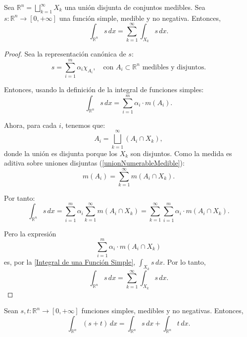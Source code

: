 \begin{lema}
    Sea $\mathbb{R}^n = \bigsqcup_{k = 1}^{\infty} X_k$ una unión disjunta de conjuntos medibles. Sea $s: \mathbb{R}^n \to [0, +\infty]$ una función simple, medible y no negativa. Entonces,
    \[
        \int_{\mathbb{R}^n} s \, dx = \sum_{k = 1}^{\infty} \int_{X_k} s \, dx.
    \]
    \label{intSimpleDisjunta}
\end{lema}

\begin{proof}
    Sea la representación canónica de $s$:
    \[
        s = \sum_{i=1}^m \alpha_i \chi_{A_i}, \quad \text{con } A_i \subset \mathbb{R}^n \text{ medibles y disjuntos.}
    \]

    Entonces, usando la definición de la integral de funciones simples:
    \[
        \int_{\mathbb{R}^n} s \, dx = \sum_{i=1}^m \alpha_i \cdot m(A_i).
    \]

    Ahora, para cada \( i \), tenemos que:
    \[
        A_i = \bigsqcup_{k=1}^{\infty} (A_i \cap X_k),
    \]
    donde la unión es disjunta porque los \( X_k \) son disjuntos. Como la medida
    es aditiva sobre uniones disjuntas (\cref{unionNumerableMedible}):
    \[
        m(A_i) = \sum_{k=1}^{\infty} m(A_i \cap X_k).
    \]

    Por tanto:
    \[
        \int_{\mathbb{R}^n} s \, dx = \sum_{i=1}^m \alpha_i \sum_{k=1}^{\infty} m(A_i \cap X_k)
        = \sum_{k=1}^{\infty} \sum_{i=1}^m \alpha_i \cdot m(A_i \cap X_k).
    \]

    Pero la expresión
    \[
        \sum_{i=1}^m \alpha_i \cdot m(A_i \cap X_k)
    \]
    es, por la \cref{Integral de una Función Simple}, \( \int_{X_k} s \, dx \). Por
    lo tanto,
    \[
        \int_{\mathbb{R}^n} s \, dx = \sum_{k=1}^{\infty} \int_{X_k} s \, dx.
    \]
\end{proof}

\begin{corolario}
    Sean \( s, t: \mathbb{R}^n \to [0, +\infty] \) funciones simples, medibles y no negativas. Entonces,
    \[
        \int_{\mathbb{R}^n} (s + t) \, dx = \int_{\mathbb{R}^n} s \, dx + \int_{\mathbb{R}^n} t \, dx.
    \]
    \label{sumaIntSimples}
\end{corolario}

